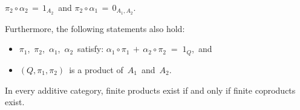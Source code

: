 \begin{proposition}
\begin{enumerate}
\begin{itemize}
		\;$\pi_{2} \circ \alpha_{2} \,=\, 1_{A_{2}}$\,
		and
		\;$\pi_{2} \circ \alpha_{1} \,=\, 0_{A_{1},A_{2}}$.\,
	\end{itemize}
	Furthermore, the following statements also hold:
	\begin{itemize}
	\item
		$\pi_{1}$, \,$\pi_{2}$, \,$\alpha_{1}$, \,$\alpha_{2}$\, satisfy:
		\;$\alpha_{1} \circ \pi_{1} \,+\, \alpha_{2} \circ \pi_{2} \; = \; 1_{Q}$,\, and
	\item
		$(Q,\pi_{1},\pi_{2})$\, is a product of \,$A_{1}$\, and \,$A_{2}$.\,
	\end{itemize}
\end{enumerate}
\end{proposition}


\vskip 0.5cm
\begin{corollary}
\mbox{}
\vskip 0.10cm
\noindent
In every additive category, finite products exist if and only if finite coproducts exist.
\end{corollary}


